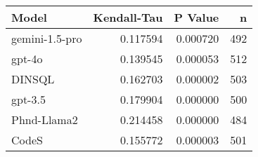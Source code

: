 \begin{tabular}{lrrr}
\toprule
Model & Kendall-Tau & P Value & n \\
\midrule
gemini-1.5-pro & 0.117594 & 0.000720 & 492 \\
gpt-4o & 0.139545 & 0.000053 & 512 \\
DINSQL & 0.162703 & 0.000002 & 503 \\
gpt-3.5 & 0.179904 & 0.000000 & 500 \\
Phnd-Llama2 & 0.214458 & 0.000000 & 484 \\
CodeS & 0.155772 & 0.000003 & 501 \\
\bottomrule
\end{tabular}
